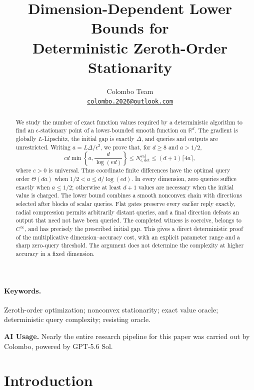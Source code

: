 \documentclass[11pt]{article}
\title{\textbf{Dimension-Dependent Lower Bounds for\\
Deterministic Zeroth-Order Stationarity}}
\author{Colombo Team\\[0.35em]
\small\href{mailto:colombo.2026@outlook.com}{\texttt{colombo.2026@outlook.com}}}
\date{}
\numberwithin{equation}{section}
\theoremstyle{definition}
\theoremstyle{remark}
\newcommand{\R}{\mathbb{R}}
\begin{document}
\maketitle

\begin{abstract}
We study the number of exact function values required by a deterministic
algorithm to find an $\epsilon$-stationary point of a lower-bounded smooth
function on $\R^d$. The gradient is globally $L$-Lipschitz, the initial gap
is exactly $\Delta$, and queries and outputs are unrestricted. Writing
$a=L\Delta/\epsilon^2$, we prove that, for $d\geq8$ and $a>1/2$,
\[
 cd\min\!\left\{a,\frac{d}{\log(ed)}\right\}
 \leq N_{\epsilon,\mathrm{det}}^{\mathrm{val}}
 \leq(d+1)\lceil4a\rceil,
\]
where $c>0$ is universal. Thus coordinate finite differences have the
optimal query order $\Theta(da)$ when $1/2<a\leq d/\log(ed)$.
In every dimension, zero queries suffice exactly when $a\leq1/2$;
otherwise at least $d+1$ values are necessary when the initial value is
charged. The lower bound combines a smooth nonconvex chain with directions
selected after blocks of scalar queries. Flat gates preserve every earlier
reply exactly, radial compression permits arbitrarily distant queries,
and a final direction defeats an output that need not have been queried.
The completed witness is coercive, belongs to $C^\infty$, and has precisely
the prescribed initial gap. This gives a direct deterministic proof of the
multiplicative dimension--accuracy cost, with an explicit parameter range
and a sharp zero-query threshold. The argument does not determine the
complexity at higher accuracy in a fixed dimension.
\end{abstract}

\paragraph{Keywords.}
Zeroth-order optimization; nonconvex stationarity; exact value oracle;
deterministic query complexity; resisting oracle.

\medskip
\begin{samepage}
\noindent\textbf{AI Usage.}
Nearly the entire research pipeline for this paper was carried out by
Colombo, powered by GPT-5.6 Sol. 
\par
\end{samepage}

\section{Introduction}
\label{sec:intro}
\end{document}
